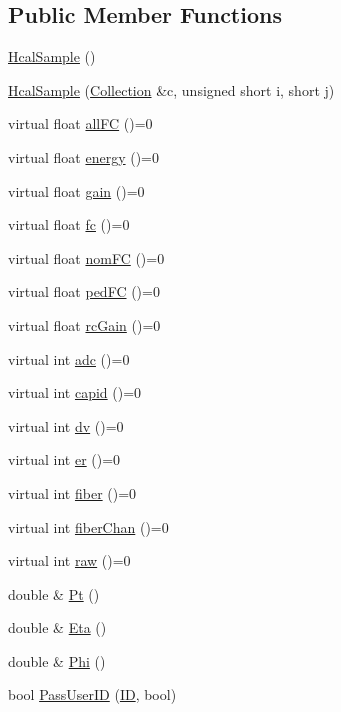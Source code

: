 \subsection*{Public Member Functions}
\begin{DoxyCompactItemize}
\item 
\hyperlink{class_hcal_sample_abda60a97180759affaa1d1b3ab181b6f}{Hcal\+Sample} ()
\item 
\hyperlink{class_hcal_sample_a1b2c66b644d6b16c0bf8efc9f2908db4}{Hcal\+Sample} (\hyperlink{class_collection}{Collection} \&c, unsigned short i, short j)
\item 
virtual float \hyperlink{class_hcal_sample_af837bd894eb8eae865023a526940ee15}{all\+F\+C} ()=0
\item 
virtual float \hyperlink{class_hcal_sample_a603c4e95d1d49db37dd00f34275fb8f3}{energy} ()=0
\item 
virtual float \hyperlink{class_hcal_sample_aefc3dd058b3b178917583ca6abbf4f01}{gain} ()=0
\item 
virtual float \hyperlink{class_hcal_sample_aed932c9f932eabed9f9bc6b1a54c20dd}{fc} ()=0
\item 
virtual float \hyperlink{class_hcal_sample_a9f47a5b867c94c97c3d553e244e7dc87}{nom\+F\+C} ()=0
\item 
virtual float \hyperlink{class_hcal_sample_a471f7ef87944ac870ea884a0cc957744}{ped\+F\+C} ()=0
\item 
virtual float \hyperlink{class_hcal_sample_a6fd32da2d5ea80154251de366f98c49c}{rc\+Gain} ()=0
\item 
virtual int \hyperlink{class_hcal_sample_a3801777ac080ca0e512c226e4cfd5682}{adc} ()=0
\item 
virtual int \hyperlink{class_hcal_sample_a51a82042ba140a68f9659140c48d83bc}{capid} ()=0
\item 
virtual int \hyperlink{class_hcal_sample_a13c0e851a42d3122c7bba32d81e31d19}{dv} ()=0
\item 
virtual int \hyperlink{class_hcal_sample_af1805d239ccbc17a6c307d66522da618}{er} ()=0
\item 
virtual int \hyperlink{class_hcal_sample_a5ae9a4d213b69f5ee382c7a6b31eb446}{fiber} ()=0
\item 
virtual int \hyperlink{class_hcal_sample_acdd36acaedfe4e1a6114e6c56d1ed996}{fiber\+Chan} ()=0
\item 
virtual int \hyperlink{class_hcal_sample_a328a0f8f80a0aae47a92500297635bd6}{raw} ()=0
\item 
double \& \hyperlink{class_hcal_sample_a06504eff6a267228754fead92c9e4955}{Pt} ()
\item 
double \& \hyperlink{class_hcal_sample_abf85f43fdc3f12861443834c97e3d3eb}{Eta} ()
\item 
double \& \hyperlink{class_hcal_sample_a39d0dd1ee5a627691cfefd92a05f7a2e}{Phi} ()
\item 
bool \hyperlink{class_hcal_sample_a46c1dc16f0be38259e07a93f26cccd73}{Pass\+User\+I\+D} (\hyperlink{_i_d_types_8h_a094c367727273b4da2b960ca3b3edc06}{I\+D}, bool)
\end{DoxyCompactItemize}
